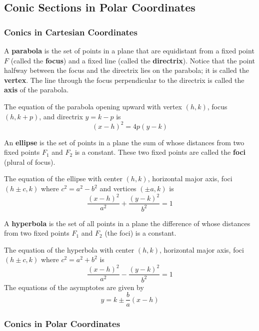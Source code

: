 \subsection{Conic Sections in Polar Coordinates}

\subsubsection*{Conics in Cartesian Coordinates}

A \textbf{parabola} is the set of points in a plane that are equidistant from
a fixed point \(F\) (called the \textbf{focus}) and a fixed line (called the
\textbf{directrix}).
Notice that the point halfway between the focus and the
directrix lies on the parabola; it is called the \textbf{vertex}.
The line through the focus perpendicular to the directrix is called the
\textbf{axis} of the parabola.

The equation of the parabola opening upward with vertex \((h,k)\), focus
\((h,k+p)\), and directrix \(y=k-p\) is
\[(x-h)^2=4p(y-k)\]

An \textbf{ellipse} is the set of points in a plane the sum of whose distances from two fixed
points \(F_1\) and \(F_2\) is a constant.
These two fixed points are called the \textbf{foci} (plural of focus).

The equation of the ellipse with center \((h,k)\), horizontal major axis, foci
\((h\pm c,k)\) where \(c^2=a^2-b^2\) and vertices \((\pm a,k)\) is
\[\frac{(x-h)^2}{a^2}+\frac{(y-k)^2}{b^2}=1\]

A \textbf{hyperbola} is the set of all points in a plane the difference of whose distances
from two fixed points \(F_1\) and \(F_2\) (the foci) is a constant.

The equation of the hyperbola with center \((h,k)\), horizontal major axis, foci
\((h\pm c,k)\) where \(c^2=a^2+b^2\) is
\[\frac{(x-h)^2}{a^2}-\frac{(y-k)^2}{b^2}=1\]
The equations of the asymptotes are given by
\[y=k\pm \frac{b}{a}(x-h)\]

\subsubsection*{Conics in Polar Coordinates}

